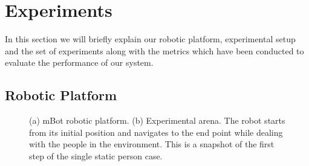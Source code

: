 \section{Experiments}
\label{sec:experimental_setup}
In this section we will briefly explain our robotic platform, experimental setup and the set of experiments along with the metrics which have been conducted to evaluate the performance of our system.

\subsection{Robotic Platform}
\label{sec:robot}

\begin{figure}[t!]
\centering
{}%
\hspace{0.1cm}
%
\hspace{0.1cm}

\caption{(a) mBot robotic platform. (b) Experimental arena. The robot starts from its initial position and navigates to the end point while dealing with the people in the environment. This is a snapshot of the first step of the single static person case.}
\label{fig:setup}
\end{figure}




